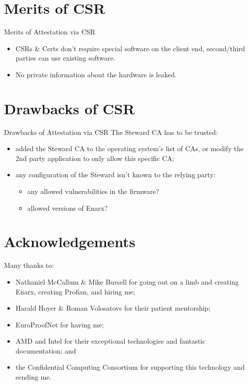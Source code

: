 \documentclass[graphics]{beamer}
\begin{document}
\section{Merits of CSR}
\begin{frame}{Merits of Attestation via CSR}
\begin{itemize}
    \item CSRs \& Certs don't require special software on the client end, second/third parties can use existing software.
    \item No private information about the hardware is leaked.
\end{itemize}
\end{frame}

\section{Drawbacks of CSR}
\begin{frame}{Drawbacks of Attestation via CSR}
The Steward CA has to be trusted:
\begin{itemize}
    \item added the Steward CA to the operating system's list of CAs, or modify the 2nd party application to only allow this specific CA;
    \item any configuration of the Steward isn't known to the relying party:
    \begin{itemize}
        \item any allowed vulnerabilities in the firmware?
        \item allowed versions of Enarx?
    \end{itemize}
\end{itemize}
\end{frame}

\section{Acknowledgements}
\begin{frame}
Many thanks to:
\begin{itemize}
    \item Nathaniel McCallum \& Mike Bursell for going out on a limb and creating Enarx, creating Profian, and hiring me;
    \item Harald Hoyer \& Roman Volosatovs for their patient mentorship;
    \item EuroProofNet for having me;
    \item AMD and Intel for their exceptional technologies and fantastic documentation; and
    \item the Confidential Computing Consortium for supporting this technology and sending me.
\end{itemize}
\end{frame}
\end{document}

